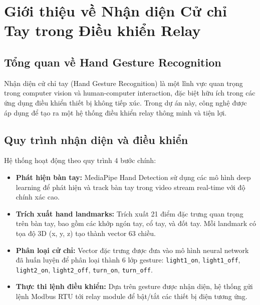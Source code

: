 \documentclass[12pt]{article}
\begin{document}
\section{Giới thiệu về Nhận diện Cử chỉ Tay trong Điều khiển Relay}

\subsection{Tổng quan về Hand Gesture Recognition}
Nhận diện cử chỉ tay (Hand Gesture Recognition) là một lĩnh vực quan trọng trong computer vision và human-computer interaction, đặc biệt hữu ích trong các ứng dụng điều khiển thiết bị không tiếp xúc. Trong dự án này, công nghệ được áp dụng để tạo ra một hệ thống điều khiển relay thông minh và tiện lợi.

\subsection{Quy trình nhận diện và điều khiển}
Hệ thống hoạt động theo quy trình 4 bước chính:

\begin{itemize}
    \item \textbf{Phát hiện bàn tay:}  
    MediaPipe Hand Detection sử dụng các mô hình deep learning để phát hiện và track bàn tay trong video stream real-time với độ chính xác cao.

    \item \textbf{Trích xuất hand landmarks:}  
    Trích xuất 21 điểm đặc trưng quan trọng trên bàn tay, bao gồm các khớp ngón tay, cổ tay, và đốt tay. Mỗi landmark có tọa độ 3D (x, y, z) tạo thành vector 63 chiều.

    \item \textbf{Phân loại cử chỉ:}  
    Vector đặc trưng được đưa vào mô hình neural network đã huấn luyện để phân loại thành 6 lớp gesture: \texttt{light1\_on}, \texttt{light1\_off}, \texttt{light2\_on}, \texttt{light2\_off}, \texttt{turn\_on}, \texttt{turn\_off}.

    \item \textbf{Thực thi lệnh điều khiển:}  
    Dựa trên gesture được nhận diện, hệ thống gửi lệnh Modbus RTU tới relay module để bật/tắt các thiết bị điện tương ứng.
\end{itemize}
\end{document}
